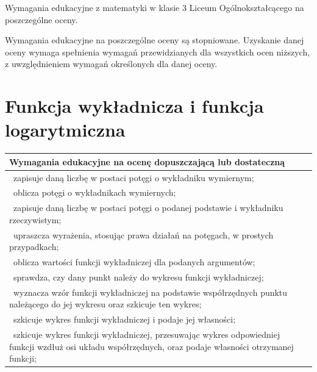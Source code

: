 \documentclass[12pt,a4paper]{article}
\begin{document}
	
	\begin{center}
		\Large Wymagania edukacyjne z matematyki w klasie 3 Liceum Ogólnokształcącego na poszczególne oceny.
	\end{center}
	
	Wymagania edukacyjne na poszczególne oceny są stopniowane.
	Uzyskanie danej oceny wymaga spełnienia wymagań przewidzianych
	dla wszystkich ocen niższych, z uwzględnieniem wymagań
	określonych dla danej oceny.
	
	\section{Funkcja wykładnicza i funkcja logarytmiczna}
	
	\begin{longtable}{|p{16cm}|}
		\hline
		
		\textbf{Wymagania edukacyjne na ocenę dopuszczającą lub dostateczną} \\ \hline
		
		\textbullet\ zapisuje daną liczbę w postaci potęgi o wykładniku wymiernym; \\
		
		\textbullet\ oblicza potęgi o wykładnikach wymiernych; \\
		
		\textbullet\ zapisuje daną liczbę w postaci potęgi o podanej podstawie i wykładniku rzeczywistym; \\
		
		\textbullet\ upraszcza wyrażenia, stosując prawa działań na potęgach, w prostych przypadkach; \\
		
		\textbullet\ oblicza wartości funkcji wykładniczej dla podanych argumentów; \\
		
		\textbullet\ sprawdza, czy dany punkt należy do wykresu funkcji wykładniczej; \\
		
		\textbullet\ wyznacza wzór funkcji wykładniczej na podstawie współrzędnych punktu należącego do jej wykresu oraz szkicuje ten wykres; \\
		
		\textbullet\ szkicuje wykres funkcji wykładniczej i podaje jej własności; \\
		
		\textbullet\ szkicuje wykres funkcji wykładniczej, przesuwając wykres odpowiedniej funkcji wzdłuż osi układu współrzędnych, oraz podaje własności otrzymanej funkcji; \\
		

\end{longtable}
\end{document}

